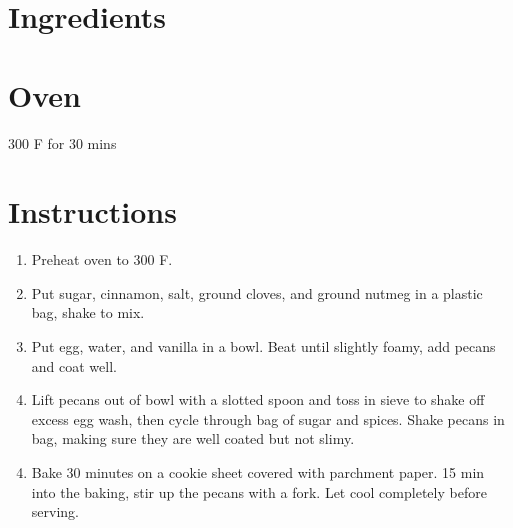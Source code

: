\documentclass[ansiapaper,10pt,english]{sphinxmanual}
\begin{document}
\section{Ingredients}
\label{\detokenize{Candied_Pecans:ingredients}}
%
\begin{sphinxVerbatim}[commandchars=\\\{\}]
  

  

   

  

  

  

  

   

   
\end{sphinxVerbatim}


\section{Oven}
\label{\detokenize{Candied_Pecans:oven}}
300 F for 30 mins


\section{Instructions}
\label{\detokenize{Candied_Pecans:instructions}}\begin{enumerate}
\item {} 
Preheat oven to 300 F.

\item {} 
Put sugar, cinnamon, salt, ground cloves, and ground nutmeg in a plastic bag, shake to mix.

\item {} 
Put egg, water, and vanilla in a bowl. Beat until slightly foamy, add pecans and coat well.

\item {} 
Lift pecans out of bowl with a slotted spoon and toss in sieve to shake off excess egg wash, then cycle through bag of sugar and spices. Shake pecans in bag, making sure they are well coated but not slimy.

\end{enumerate}
\begin{enumerate}
\setcounter{enumi}{3}
\item {} 
Bake 30 minutes on a cookie sheet covered with parchment paper. 15 min into the baking, stir up the pecans with a fork. Let cool completely before serving.

\end{enumerate}
\end{document}

